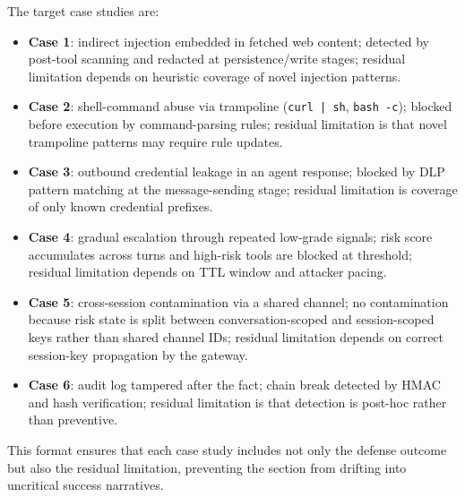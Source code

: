 The target case studies are:

\begin{itemize}[leftmargin=1.5em]
  \item \textbf{Case 1}: indirect injection embedded in fetched web content; detected by post-tool scanning and redacted at persistence/write stages; residual limitation depends on heuristic coverage of novel injection patterns.
  \item \textbf{Case 2}: shell-command abuse via trampoline (\texttt{curl | sh}, \texttt{bash -c}); blocked before execution by command-parsing rules; residual limitation is that novel trampoline patterns may require rule updates.
  \item \textbf{Case 3}: outbound credential leakage in an agent response; blocked by DLP pattern matching at the message-sending stage; residual limitation is coverage of only known credential prefixes.
  \item \textbf{Case 4}: gradual escalation through repeated low-grade signals; risk score accumulates across turns and high-risk tools are blocked at threshold; residual limitation depends on TTL window and attacker pacing.
  \item \textbf{Case 5}: cross-session contamination via a shared channel; no contamination because risk state is split between conversation-scoped and session-scoped keys rather than shared channel IDs; residual limitation depends on correct session-key propagation by the gateway.
  \item \textbf{Case 6}: audit log tampered after the fact; chain break detected by HMAC and hash verification; residual limitation is that detection is post-hoc rather than preventive.
\end{itemize}

This format ensures that each case study includes not only the defense outcome but also the residual limitation, preventing the section from drifting into uncritical success narratives.
